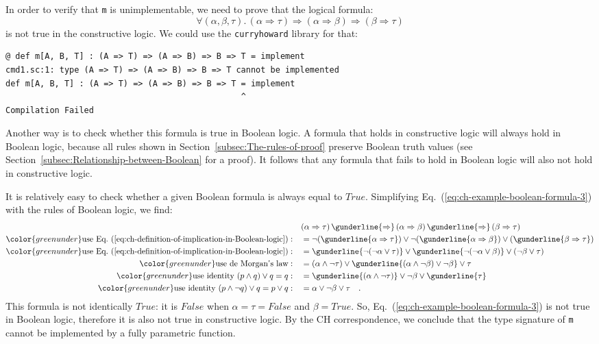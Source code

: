 In order to verify that \lstinline!m! is unimplementable, we need
to prove that the logical formula:
\begin{equation}
\forall(\alpha,\beta,\tau).\,(\alpha\Rightarrow\tau)\Rightarrow(\alpha\Rightarrow\beta)\Rightarrow(\beta\Rightarrow\tau)\label{eq:ch-example-boolean-formula-3}
\end{equation}
is not true in the constructive logic. We could use the \texttt{curryhoward}
library for that:
\begin{lstlisting}
@ def m[A, B, T] : (A => T) => (A => B) => B => T = implement
cmd1.sc:1: type (A => T) => (A => B) => B => T cannot be implemented
def m[A, B, T] : (A => T) => (A => B) => B => T = implement
                                                ^
Compilation Failed
\end{lstlisting}
Another way is to check whether this formula is true in Boolean logic.
A formula that holds in constructive logic will always hold in Boolean
logic, because all rules shown in Section~\ref{subsec:The-rules-of-proof}
preserve Boolean truth values (see Section~\ref{subsec:Relationship-between-Boolean}
for a proof). It follows that any formula that fails to hold in Boolean
logic will also not hold in constructive logic. 

It is relatively easy to check whether a given Boolean formula is
always equal to $True$. Simplifying Eq.~(\ref{eq:ch-example-boolean-formula-3})
with the rules of Boolean logic, we find:
\begin{align*}
 & (\alpha\Rightarrow\tau)\,\gunderline{\Rightarrow}\,(\alpha\Rightarrow\beta)\,\gunderline{\Rightarrow}\,(\beta\Rightarrow\tau)\\
{\color{greenunder}\text{use Eq.~(\ref{eq:ch-definition-of-implication-in-Boolean-logic})}:}\quad & =\neg(\gunderline{\alpha\Rightarrow\tau})\vee\neg(\gunderline{\alpha\Rightarrow\beta})\vee(\gunderline{\beta\Rightarrow\tau})\\
{\color{greenunder}\text{use Eq.~(\ref{eq:ch-definition-of-implication-in-Boolean-logic})}:}\quad & =\gunderline{\neg(\neg\alpha\vee\tau)}\vee\gunderline{\neg(\neg\alpha\vee\beta)}\vee(\neg\beta\vee\tau)\\
{\color{greenunder}\text{use de Morgan\textsf{'}s law}:}\quad & =\left(\alpha\wedge\neg\tau\right)\vee\gunderline{\left(\alpha\wedge\neg\beta\right)\vee\neg\beta}\vee\tau\\
{\color{greenunder}\text{use identity }(p\wedge q)\vee q=q:}\quad & =\gunderline{\left(\alpha\wedge\neg\tau\right)}\vee\neg\beta\vee\gunderline{\tau}\\
{\color{greenunder}\text{use identity }(p\wedge\neg q)\vee q=p\vee q:}\quad & =\alpha\vee\neg\beta\vee\tau\quad.
\end{align*}
This formula is not identically $True$: it is $False$ when $\alpha=\tau=False$
and $\beta=True$. So, Eq.~(\ref{eq:ch-example-boolean-formula-3})
is not true in Boolean logic, therefore it is also not true in constructive
logic. By the CH correspondence, we conclude that the type signature
of \lstinline!m! cannot be implemented by a fully parametric function.

